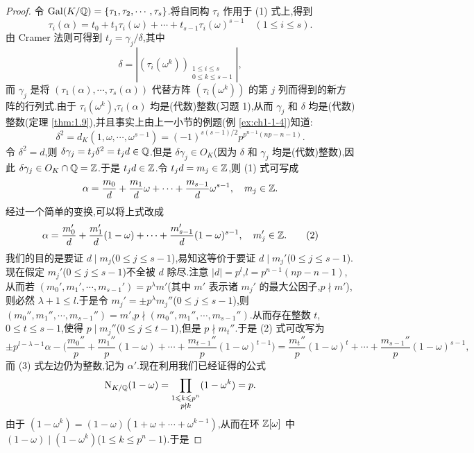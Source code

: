 \begin{proof}
令 $\operatorname{Gal}(K/\mathbb{Q})=\{\tau_1,\tau_2,\cdots,\tau_s\}$.将自同构 $\tau_i$ 作用于 (1) 式上,得到
\[
  \tau_i(\alpha)=t_0+t_1\tau_i(\omega)+\cdots+t_{s-1}\tau_i(\omega)^{s-1}\quad (1\leqslant i\leqslant s).
\]
由 Cramer 法则可得到 $t_j=\gamma_j/\delta$,其中
\[
  \delta=\left|(\tau_i(\omega^k))_{\substack{1\leqslant i\leqslant s\\ 0\leqslant k\leqslant s-1}}\right|,
\]
而 $\gamma_j$ 是将 $(\tau_1(\alpha),\cdots,\tau_s(\alpha))$ 代替方阵 $(\tau_i(\omega^k))$ 的第 $j$ 列而得到的新方阵的行列式.由于 $\tau_i(\omega^k)$,$\tau_i(\alpha)$ 均是(代数)整数(习题 1),从而 $\gamma_j$ 和 $\delta$ 均是(代数)整数(定理 \ref{thm:1.9}),并且事实上由上一小节的例题(例 \ref{ex:ch1-1-4})知道:
\[
  \delta^2=d_K(1,\omega,\cdots,\omega^{s-1})
  =(-1)^{s(s-1)/2}p^{p^{n-1}(np-n-1)}.
\]
令 $\delta^2=d$,则 $\delta\gamma_j=t_j\delta^2=t_jd\in\mathbb{Q}$.但是 $\delta\gamma_j\in O_K$(因为 $\delta$ 和 $\gamma_j$ 均是(代数)整数),因此 $\delta\gamma_j\in O_K\cap\mathbb{Q}=\mathbb{Z}$.于是 $t_jd\in\mathbb{Z}$.令 $t_jd=m_j\in\mathbb{Z}$,则 (1) 式可写成
\[
  \alpha=\frac{m_0}{d}+\frac{m_1}{d}\omega+\cdots+\frac{m_{s-1}}{d}\omega^{s-1},\quad m_j\in\mathbb{Z}.
\]
经过一个简单的变换,可以将上式改成
\begin{equation}  \alpha=\frac{m_0'}{d}+\frac{m_1'}{d}(1-\omega)+\cdots+\frac{m_{s-1}'}{d}(1-\omega)^{s-1},\quad m_j'\in\mathbb{Z}.\tag{2}\end{equation}
我们的目的是要证 $d\mid m_j$($0\leqslant j\leqslant s-1$),易知这等价于要证 $d\mid m_j'$($0\leqslant j\leqslant s-1$).现在假定 $m_j'$($0\leqslant j\leqslant s-1$)不全被 $d$ 除尽.注意 $|d|=p^l$,$l=p^{n-1}(np-n-1)$,从而若 $(m_0',m_1',\cdots,m_{s-1}')=p^\lambda m'$(其中 $m'$ 表示诸 $m_j'$ 的最大公因子,$p\nmid m'$),则必然 $\lambda+1\leqslant l$.于是令 $m_j'=\pm p^\lambda m_j''$($0\leqslant j\leqslant s-1$),则 $(m_0'',m_1'',\cdots,m_{s-1}'')=m'$,$p\nmid(m_0'',m_1'',\cdots,m_{s-1}'')$.从而存在整数 $t$,$0\leqslant t\leqslant s-1$,使得 $p\mid m_j''$($0\leqslant j\leqslant t-1$),但是 $p\nmid m_t''$.于是 (2) 式可改写为
\begin{equation}  \pm p^{l-\lambda-1}\alpha-\Big(\frac{m_0''}{p}+\frac{m_1''}{p}(1-\omega)+\cdots+\frac{m_{t-1}''}{p}(1-\omega)^{t-1}\Big)
  =\frac{m_t''}{p}(1-\omega)^t+\cdots+\frac{m_{s-1}''}{p}(1-\omega)^{s-1},\tag{3}\end{equation}
而 (3) 式左边仍为整数,记为 $\alpha'$.现在利用我们已经证得的公式
\[
  \mathrm{N}_{K/\mathbb{Q}}(1-\omega)=\prod_{\substack{1\leqslant k\leqslant p^n\\ p\nmid k}}(1-\omega^k)=p.
\]
由于 $(1-\omega^k)=(1-\omega)(1+\omega+\cdots+\omega^{k-1})$,从而在环 $\mathbb{Z}[\omega]$ 中 $(1-\omega)\mid(1-\omega^k)$($1\leqslant k\leqslant p^n-1$).于是

\end{proof}
